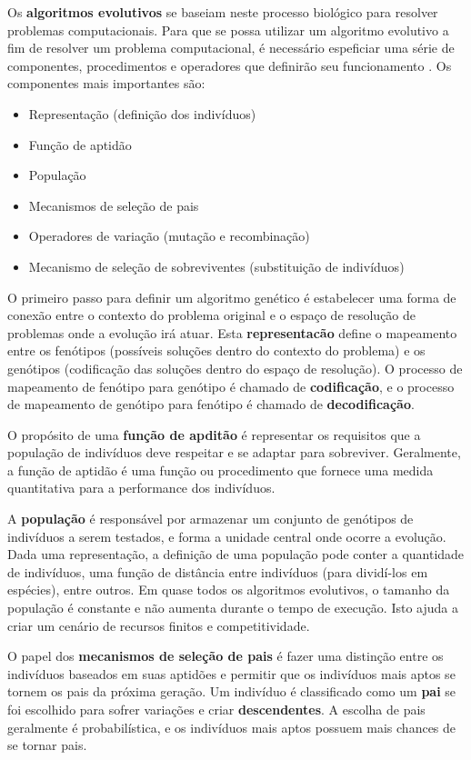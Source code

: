 Os \textbf{algoritmos evolutivos} se baseiam neste processo biológico para
resolver problemas computacionais. Para que se possa utilizar um algoritmo
evolutivo a fim de resolver um problema computacional, é necessário espeficiar
uma série de componentes, procedimentos e operadores que definirão seu
funcionamento \cite[Cap. 3]{IntroEvolComputing}. Os componentes mais importantes
são:

\begin{itemize}
	\item Representação (definição dos indivíduos)
	\item Função de aptidão
	\item População
	\item Mecanismos de seleção de pais
	\item Operadores de variação (mutação e recombinação)
	\item Mecanismo de seleção de sobreviventes (substituição de indivíduos)
\end{itemize}

O primeiro passo para definir um algoritmo genético é estabelecer uma forma de
conexão entre o contexto do problema original e o espaço de resolução de
problemas onde a evolução irá atuar. Esta \textbf{representacão} define o
mapeamento entre os fenótipos (possíveis soluções dentro do contexto do
problema) e os genótipos (codificação das soluções dentro do espaço de
resolução). O processo de mapeamento de fenótipo para genótipo é chamado de
\textbf{codificação}, e o processo de mapeamento de genótipo para fenótipo é
chamado de \textbf{decodificação}.

O propósito de uma \textbf{função de apditão} é representar os requisitos que a
população de indivíduos deve respeitar e se adaptar para sobreviver. Geralmente,
a função de aptidão é uma função ou procedimento que fornece uma medida
quantitativa para a performance dos indivíduos.

A \textbf{população} é responsável por armazenar um conjunto de genótipos de
indivíduos a serem testados, e forma a unidade central onde ocorre a evolução.
Dada uma representação, a definição de uma população pode conter a quantidade de
indivíduos, uma função de distância entre indivíduos (para dividí-los em
espécies), entre outros. Em quase todos os algoritmos evolutivos, o tamanho da
população é constante e não aumenta durante o tempo de execução. Isto ajuda a
criar um cenário de recursos finitos e competitividade. 

O papel dos \textbf{mecanismos de seleção de pais} é fazer uma distinção entre
os indivíduos baseados em suas aptidões e permitir que os indivíduos mais aptos
se tornem os pais da próxima geração. Um indivíduo é classificado como um
\textbf{pai} se foi escolhido para sofrer variações e criar
\textbf{descendentes}. A escolha de pais geralmente é probabilística, e os
indivíduos mais aptos possuem mais chances de se tornar pais.

